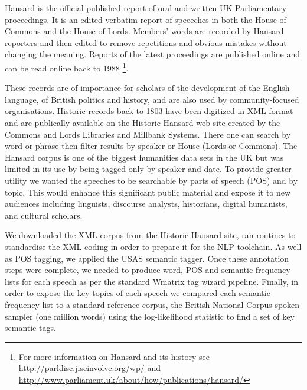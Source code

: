 Hansard is the official published report of oral and written UK Parliamentary proceedings. It is an edited verbatim report of speeeches in both the House of Commons and the House of Lords. Members' words are recorded by Hansard reporters and then edited to remove repetitions and obvious mistakes without changing the meaning. Reports of the latest proceedings are published online
and can be read online back to 1988%
\footnote{For more information on Hansard and its history see \url{http://parldisc.jiscinvolve.org/wp/} and \url{http://www.parliament.uk/about/how/publications/hansard/}}.

These records are of importance for scholars of the development of the English language, of British politics and history, and are also used by community-focused organisations.  Historic records back to 1803 have been digitized in XML format and are publically available on the Historic Hansard web site created by the Commons and Lords Libraries and Millbank Systems. There one can search by word or phrase then filter results by speaker or House (Lords or Commons). 
The Hansard corpus is one of the biggest humanities data sets in the UK but was limited in its use by being tagged only by speaker and date. To provide greater utility we wanted the speeches to be searchable by parts of speech (POS) and by topic. This would enhance this significant public material and expose it to new audiences
including linguists, discourse analysts, historians, digital humanists, and cultural scholars. 

We downloaded the XML corpus from the Historic Hansard site, ran routines to standardise the XML coding in order to prepare it for the NLP toolchain. As well as POS tagging, we applied the USAS semantic tagger. Once these annotation steps were complete, we needed to produce word, POS and semantic frequency lists for each speech as per the standard Wmatrix tag wizard pipeline. Finally, in order to expose the key topics of each speech we compared each semantic frequency list to a standard reference corpus, the British National Corpus spoken sampler (one million words) using the log-likelihood statistic to find a set of key semantic tags.




